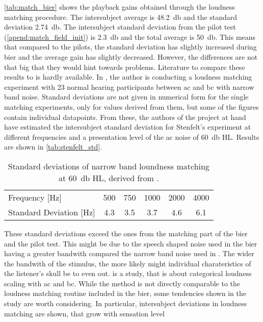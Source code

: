 \autoref{tab:match_bier} shows the playback gains obtained through the loudness matching procedure. The intersubject average is \SI{48.2}{\decibel} and the standard deviation \SI{2.74}{\decibel}.
The intersubject standard deviation from the pilot test (\autoref{apend:match_field_init}) is \SI{2.3}{\decibel} and the total average is \SI{50}{\decibel}.
This means that compared to the pilots, the standard deviation has slightly increased during \gls{bier} and the average gain has slightly decreased.
However, the differences are not that big that they would hint towards problems.
Literature to compare these results to is hardly available.
In \citep{stenfelt_02}, the author is conducting a loudness matching experiment with 23 normal hearing participants between \gls{ac} and \gls{bc} with narrow band noise. Standard deviations are not given in numerical form for the single matching experiments, only for values derived from them, but some of the figures contain individual datapoints.
From these, the authors of the project at hand have estimated the intersubject standard deviation for Stenfelt's experiment at different frequencies and a presentation level of the \gls{ac} noise of \SI{60}{\decibel} HL. Results are shown in \autoref{tab:stenfelt_std}.
\begin{table}[H]
\caption{Standard deviations of narrow band loundness matching at \SI{60}{\decibel} HL, derived from \citep[Fig. 1 b)-c)]{stenfelt_02}.}
\label{tab:stenfelt_std}
\centering
\begin{tabular}{lccccc}
Frequency [\si{\hertz}]          & 500 & 750 & 1000 & 2000 & 4000 \\
Standard Deviation [\si{\hertz}] & 4.3 & 3.5 & 3.7  & 4.6  & 6.1 
\end{tabular}
\end{table}
These standard deviations exceed the ones from the matching part of the \gls{bier} and the pilot test. This might be due to the speech shaped noise used in the \gls{bier} having a greater bandwith compared the narrow band noise used in \citep{stenfelt_02}. The wider the bandwith of the stimulus, the more likely might individual charateristics of the listener's skull be to even out.
\citep{STENFELT201385} is a study, that is about categorical loudness scaling with \gls{ac} and \gls{bc}. While the method is not directly comparable to the loudness matching routine included in the \gls{bier}, some tendencies shown in the study are worth considering. In particular, intersubject deviations in loudness matching are shown, that grow with sensation level

